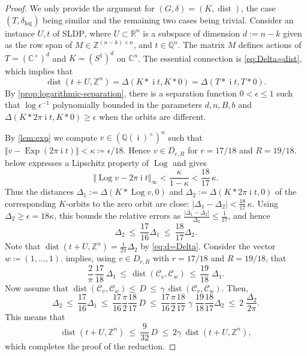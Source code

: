 \documentclass[a4paper,USenglish,cleveref,numberwithinsect]{lipics-v2021}
\DeclareMathOperator{\ii}{i}
\DeclareMathOperator{\Log}{Log}
\DeclareMathOperator{\Exp}{Exp}
\DeclareMathOperator{\dist}{dist}
\newcommand{\distLD}{\delta_{\log}}
\newcommand{\QQ}{\mathbb{Q}}
\newcommand{\CC}{\mathbb{C}}
\newcommand{\ZZ}{\mathbb{Z}}
\newcommand{\RR}{\mathbb{R}}
\newcommand{\KK}{\ensuremath{\mathcal{C}}}
\numberwithin{equation}{section}
\begin{document}
\begin{proof}
We only provide the argument for $(G,\delta)=(K,\dist)$, the case $(T,\distLD)$ being similar
and the remaining two cases being trivial.
Consider an instance $U,t$ of \textsc{SLDP}, where $U\subset\RR^n$ is a subspace
of dimension $d:=n-k$ given as the row span of $M\in\ZZ^{(n-k)\times n}$, and $t\in\QQ^n$.
The matrix $M$ defines actions of $T=(\CC^\times)^d$ and $K=(S^1)^d$ on $\CC^n$.
The essential connection is \cref{eq:Delta=dist},
which implies that
\begin{equation}\label{eq:d=Delta}
  \dist(t+U,\ZZ^n) = \Delta( K\ast \ii t , K\ast 0 ) = \Delta(T\ast \ii t, T\ast 0).
\end{equation}
By \cref{prop:logarithmic-separation},
there is a separation function $0<\epsilon \le 1$ such that
$\log\epsilon^{-1}$ polynomially bounded in the parameters $d,n,B,b$ and
$\Delta(K\ast 2\pi\ii t, K\ast 0)\geq \epsilon$ when the orbits are different.

By \cref{lem:exp} we compute
$v\in(\QQ(\ii)^\times)^n$ such that
$ \Vert v-\Exp(2\pi\ii t)\Vert< \kappa\coloneqq\epsilon/18$.
Hence $v\in D_{r,R}$ for $r=17/18$ and $R=19/18$.
 below expresses a Lipschitz property of $\Log$
and gives
$$
 \Vert \Log v -2\pi\ii t\Vert_\infty < \frac{\kappa}{1-\kappa} < \frac{18}{17}\, \kappa .
$$
Thus the distances
$\Delta_1 := \Delta(K\ast\Log v, 0)$ and
$\Delta_2 :=\Delta(K\ast 2\pi\ii t, 0)$
of the corresponding $K$-orbits to the zero orbit are close:
$|\Delta_1 - \Delta_2| <  \frac{18}{17}\, \kappa$.
Using $\Delta_2 \ge \epsilon = 18\kappa$,
this bounds the relative errors as
$\frac{|\Delta_1 - \Delta_2|}{\Delta_2} \le \frac{1}{17}$,
and hence
$$
 \Delta_2 \ \le\  \frac{17}{16}\Delta_1 \ \le\  \frac{18}{17} \Delta_2 .
$$
Note that
$\dist(t+U,\ZZ^n) = \frac{1}{2\pi} \Delta_2$
by \cref{eq:d=Delta}.
Consider the vector $w\coloneqq (1,\ldots,1)$.
 implies,
using $v\in D_{r,R}$ with $r=17/18$ and $R=19/18$, that
\begin{equation}\label{eq:ineq}
 \frac{2}{\pi}\, \frac{17}{18}\, \Delta_1 \, \leq\,\dist(\KK_v,\KK_w)\, \leq \, \frac{19}{18} \; \Delta_1 .
\end{equation}
Now assume that
$\dist(\KK_v,\KK_w) \leq \, D\, \leq \, \gamma\, \dist(\KK_v,\KK_w)$.
Then, %
$$
 \Delta_2 \ \le\ \frac{17}{16}\Delta_1 \ \le\ \frac{17}{16} \frac{\pi}{2} \frac{18}{17} \, D
  \ \le\
 \frac{17}{16} \frac{\pi}{2} \frac{18}{17}\; \gamma\; \frac{19}{18} \frac{18}{17} \Delta_2
  \ \le\  2\; \frac{\Delta_2}{2\pi} .
$$
This means that
$$
   \dist(t+U,\ZZ^n) \ \le\  \frac{9}{32}\, D \ \le\ 2 \gamma \ \dist(t+U,\ZZ^n) ,
$$
which completes the proof of the reduction.
\end{proof}
\end{document}
